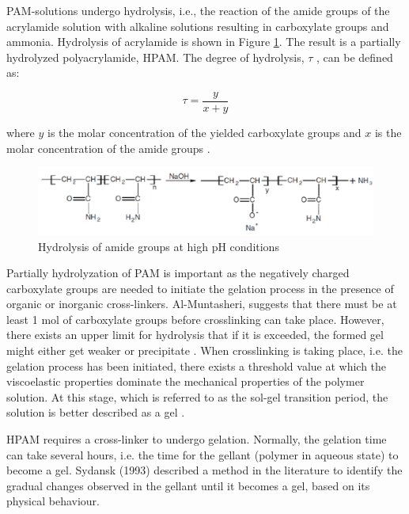PAM-solutions undergo hydrolysis, i.e., the reaction of the amide groups of the acrylamide solution with alkaline solutions resulting in carboxylate groups and ammonia. Hydrolysis of acrylamide is shown in Figure \ref{fig:amideHydrol}. The result is a partially hydrolyzed polyacrylamide,  HPAM. The degree of hydrolysis, $\tau$ , can be defined as:

\begin{equation}
    \tau = \frac{y}{x+y}
\end{equation}							

where $y$ is the molar concentration of the yielded carboxylate groups and $x$ is the molar concentration of the amide groups \citep{Al-Muntasheri2012}.

\begin{figure}
    \centering
    \includegraphics[width=\textwidth]{img/fig/amideHydrol.png}
    \caption{Hydrolysis of amide groups at high pH conditions \citep{Al-muntasheri2008}}
    \label{fig:amideHydrol} %
\end{figure}

Partially hydrolyzation of PAM is important as the negatively charged carboxylate groups are needed to initiate the gelation process in the presence of organic or inorganic cross-linkers. Al-Muntasheri, suggests that there must be at least 1 mol of carboxylate groups before crosslinking can take place. However, there exists an upper limit for hydrolysis that if it is exceeded, the formed gel might either get weaker or precipitate \citep{Al-Muntasheri2007}. When crosslinking is taking place, i.e. the gelation process has been initiated, there exists a threshold value at which the viscoelastic properties dominate the mechanical properties of the polymer solution. At this stage, which is referred to as the sol-gel transition period, the solution is better described as a gel \citep{Albonico1994}.

HPAM requires a cross-linker  to undergo gelation. Normally, the gelation time can take several hours, i.e. the time for the gellant (polymer in aqueous state) to become a gel. \cite{Sydansk1993} Sydansk (1993) described a method in the literature to identify the gradual changes observed in the gellant until it becomes a gel, based on its physical behaviour.

